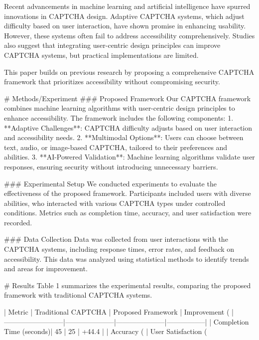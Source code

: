 Recent advancements in machine learning and artificial intelligence have spurred innovations in CAPTCHA design. Adaptive CAPTCHA systems, which adjust difficulty based on user interaction, have shown promise in enhancing usability. However, these systems often fail to address accessibility comprehensively. Studies also suggest that integrating user-centric design principles can improve CAPTCHA systems, but practical implementations are limited.  

This paper builds on previous research by proposing a comprehensive CAPTCHA framework that prioritizes accessibility without compromising security.  

# Methods/Experiment  
### Proposed Framework  
Our CAPTCHA framework combines machine learning algorithms with user-centric design principles to enhance accessibility. The framework includes the following components:  
1. **Adaptive Challenges**: CAPTCHA difficulty adjusts based on user interaction and accessibility needs.  
2. **Multimodal Options**: Users can choose between text, audio, or image-based CAPTCHA, tailored to their preferences and abilities.  
3. **AI-Powered Validation**: Machine learning algorithms validate user responses, ensuring security without introducing unnecessary barriers.  

### Experimental Setup  
We conducted experiments to evaluate the effectiveness of the proposed framework. Participants included users with diverse abilities, who interacted with various CAPTCHA types under controlled conditions. Metrics such as completion time, accuracy, and user satisfaction were recorded.  

### Data Collection  
Data was collected from user interactions with the CAPTCHA systems, including response times, error rates, and feedback on accessibility. This data was analyzed using statistical methods to identify trends and areas for improvement.  

# Results  
Table 1 summarizes the experimental results, comparing the proposed framework with traditional CAPTCHA systems.  

| Metric                  | Traditional CAPTCHA | Proposed Framework | Improvement (%
|--------------------------|---------------------|---------------------|-----------------|  
| Completion Time (seconds)| 45                 | 25                 | +44.4           |  
| Accuracy (%
| User Satisfaction (%

